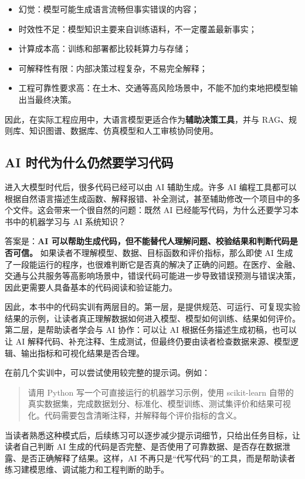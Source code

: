 \begin{itemize}
    \item 幻觉：模型可能生成语言流畅但事实错误的内容；
    \item 时效性不足：模型知识主要来自训练语料，不一定覆盖最新事实；
    \item 计算成本高：训练和部署都比较耗算力与存储；
    \item 可解释性有限：内部决策过程复杂，不易完全解释；
    \item 工程可靠性要求高：在土木、交通等高风险场景中，不能不加约束地把模型输出当最终决策。
\end{itemize}

因此，在实际工程应用中，大语言模型更适合作为\textbf{辅助决策工具}，并与 RAG、规则库、知识图谱、数据库、仿真模型和人工审核协同使用。

\subsection{AI 时代为什么仍然要学习代码}

进入大模型时代后，很多代码已经可以由 AI 辅助生成。许多 AI 编程工具都可以根据自然语言描述生成函数、解释报错、补全测试，甚至辅助修改一个项目中的多个文件。这会带来一个很自然的问题：既然 AI 已经能写代码，为什么还要学习本书中的机器学习与 AI 系统知识？

答案是：\textbf{AI 可以帮助生成代码，但不能替代人理解问题、校验结果和判断代码是否可信。} 如果读者不理解模型、数据、目标函数和评价指标，那么即使 AI 生成了一段能运行的程序，也很难判断它是否真的解决了正确的问题。在医疗、金融、交通与公共服务等高影响场景中，错误代码可能进一步导致错误预测与错误决策，因此更需要人具备基本的代码阅读和验证能力。

因此，本书中的代码实训有两层目的。第一层，是提供规范、可运行、可复现实验结果的示例，让读者真正理解数据如何进入模型、模型如何训练、结果如何评价。第二层，是帮助读者学会与 AI 协作：可以让 AI 根据任务描述生成初稿，也可以让 AI 解释代码、补充注释、生成测试，但最终仍要由读者检查数据来源、模型逻辑、输出指标和可视化结果是否合理。

在前几个实训中，可以尝试使用较完整的提示词。例如：

\begin{quote}
请用 Python 写一个可直接运行的机器学习示例，使用 scikit-learn 自带的真实数据集，完成数据划分、标准化、模型训练、测试集评价和结果可视化。代码需要包含清晰注释，并解释每个评价指标的含义。
\end{quote}

当读者熟悉这种模式后，后续练习可以逐步减少提示词细节，只给出任务目标，让读者自己判断 AI 生成的代码是否完整、是否使用了可靠数据、是否存在数据泄露、是否正确解释了结果。这样，AI 不再只是“代写代码”的工具，而是帮助读者练习建模思维、调试能力和工程判断的助手。

